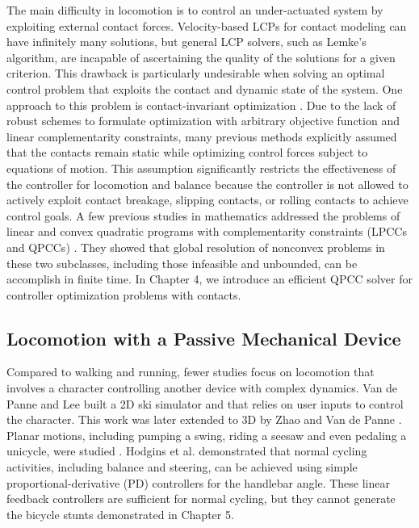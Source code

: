 The main difficulty in
locomotion is to control an under-actuated system by exploiting
external contact forces. Velocity-based LCPs for contact
modeling can have infinitely many solutions, but general LCP solvers,
such as Lemke's algorithm, are incapable of ascertaining the quality of
the solutions for a given criterion. This drawback is particularly
undesirable when solving an optimal control problem that exploits the
contact and dynamic state of the system. One approach to this problem is contact-invariant optimization \cite{Mordatch:2012,Mordatch:2013}. Due to the lack of robust
schemes to formulate optimization with arbitrary objective function
and linear complementarity constraints, many previous methods
explicitly assumed that the contacts remain static
\cite{Abe:2007,Jain:2009,Kim:2011:DCO} while optimizing control forces
subject to equations of motion. This assumption significantly
restricts the effectiveness of the controller for locomotion and balance
because the controller is not allowed to actively exploit contact
breakage, slipping contacts, or rolling contacts to achieve control
goals. A few previous studies in mathematics addressed the problems of
linear and convex quadratic programs with complementarity constraints
(LPCCs and QPCCs) \cite{Hu:2008,Bai:2011}. They showed that global resolution of
nonconvex problems in these two subclasses, including those infeasible
and unbounded, can be accomplish in finite time. In Chapter 4, we introduce an efficient QPCC solver for controller optimization problems with contacts. 

\subsection{Locomotion with a Passive Mechanical Device} Compared to walking and running, fewer studies focus on locomotion that involves a character controlling another device with complex dynamics. Van de Panne and Lee \cite{vandepanne:2003} built a 2D ski simulator and that relies on user inputs to control the character. This work was later extended to 3D by Zhao and Van de Panne \cite{Zhao:2005}. Planar motions, including pumping a swing, riding a seesaw and even pedaling a unicycle, were studied \cite{Hodgins:1992}. Hodgins et al. \cite{Hodgins:1995:AHA} demonstrated that normal cycling activities, including balance and steering, can be achieved using simple proportional-derivative (PD) controllers for the handlebar angle. These linear feedback controllers are sufficient for normal cycling, but they cannot generate the bicycle stunts demonstrated in Chapter 5.


